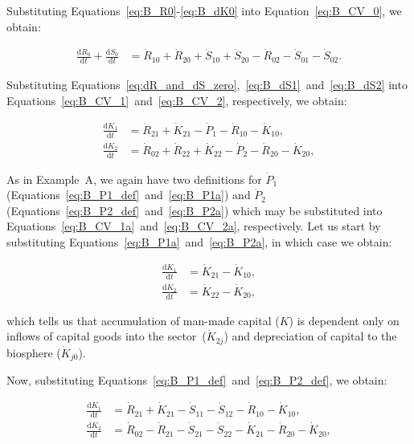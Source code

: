 Substituting
Equations~\ref{eq:B_R0}-\ref{eq:B_dK0}
into Equation~\ref{eq:B_CV_0}, 
we obtain:

\begin{align} \label{eq:B_CV_0a}
	\frac{\mathrm{d}R_{0}}{\mathrm{d}t} 
	+ \frac{\mathrm{d}S_{0}}{\mathrm{d}t}		& 
	= \dot{R}_{10} + \dot{R}_{20} 
	+ \dot{S}_{10} + \dot{S}_{20} 
	- \dot{R}_{02} 
	- \dot{S}_{01}
	- \dot{S}_{02}.
\end{align}

Substituting Equations~\ref{eq:dR_and_dS_zero},~\ref{eq:B_dS1}~and~\ref{eq:B_dS2}
into Equations~\ref{eq:B_CV_1}~and~\ref{eq:B_CV_2},
respectively,
we obtain:

\begin{align} 
\label{eq:B_CV_1a}
	 \frac{\mathrm{d}K_{1}}{\mathrm{d}t}	&
	=  \dot{R}_{21}
	+ \dot{K}_{21}
	- \dot{P}_{1} 
	- \dot{R}_{10} 
	- \dot{K}_{10},							\\
\label{eq:B_CV_2a}
	\frac{\mathrm{d}K_{2}}{\mathrm{d}t}	&
	=  \dot{R}_{02} 
	+ \dot{R}_{22} 
	+ \dot{K}_{22}
	- \dot{P}_{2}
	- \dot{R}_{20} 
	- \dot{K}_{20},
\end{align}


As in Example~A,
we again have two definitions for $\dot{P}_{1}$
(Equations~\ref{eq:B_P1_def}~and~\ref{eq:B_P1a})
and $\dot{P}_{2}$ 
(Equations~\ref{eq:B_P2_def}~and~\ref{eq:B_P2a})
which may be substituted into
Equations~\ref{eq:B_CV_1a}~and~\ref{eq:B_CV_2a},
respectively. 
Let us start by substituting Equations~\ref{eq:B_P1a}~and~\ref{eq:B_P2a},
in which case we obtain:

\begin{align} 
\label{eq:B_CV_1b}
	 \frac{\mathrm{d}K_{1}}{\mathrm{d}t}	&
	= \dot{K}_{21}
	- \dot{K}_{10},							\\
\label{eq:B_CV_2b}
	\frac{\mathrm{d}K_{2}}{\mathrm{d}t}	&
	=  \dot{K}_{22}
	- \dot{K}_{20},
\end{align}

\noindent{}which tells us that accumulation 
of man-made capital ($K$) is dependent
only on inflows of capital goods into the 
sector~($\dot{K}_{2j}$) and depreciation
of capital to the biosphere ($\dot{K}_{j0}$).

Now, substituting
Equations~\ref{eq:B_P1_def}~and~\ref{eq:B_P2_def},
we obtain:

\begin{align} 
\label{eq:B_CV_1c}
	 \frac{\mathrm{d}K_{1}}{\mathrm{d}t}	&
	=  \dot{R}_{21}
	+ \dot{K}_{21}
	- \dot{S}_{11}
	- \dot{S}_{12} 
	- \dot{R}_{10} 
	- \dot{K}_{10},							\\
\label{eq:B_CV_2c}
	\frac{\mathrm{d}K_{2}}{\mathrm{d}t}	&
	=  \dot{R}_{02} 
	- \dot{R}_{21}
	- \dot{S}_{21}
	- \dot{S}_{22}
	- \dot{K}_{21}	 
	- \dot{R}_{20} 
	- \dot{K}_{20},
\end{align}

